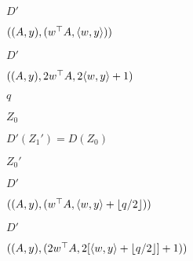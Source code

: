 \documentclass[10pt]{book}
\begin{document}
\begin{mdSnippets}
\begin{mdInlineSnippet}[0232f27be40b2b647f260050dd308eb8]%
$D'$\end{mdInlineSnippet}%
\begin{mdInlineSnippet}%
$((A,y), (w^\top A, \langle w,y \rangle))$\end{mdInlineSnippet}%
\begin{mdInlineSnippet}[0232f27be40b2b647f260050dd308eb8]%
$D'$\end{mdInlineSnippet}%
\begin{mdInlineSnippet}[c4bb7aa932c8dc3750f4cdac563381e3]%
$((A,y), 2w^\top A, 2\langle w,y \rangle + 1)$\end{mdInlineSnippet}%
\begin{mdInlineSnippet}[7694f4a66316e53c8cdd9d9954bd611d]%
$q$\end{mdInlineSnippet}%
\begin{mdInlineSnippet}[593d9b96ceba775ac243cb137dd63e4b]%
$Z_0$\end{mdInlineSnippet}%
\begin{mdInlineSnippet}[be06de8cf33017a369fda2d48475f1f0]%
$D'(Z_1') = D(Z_0)$\end{mdInlineSnippet}%
\begin{mdInlineSnippet}[db9e33ed5e5e8294b8693f8cc6334941]%
$Z_0'$\end{mdInlineSnippet}%
\begin{mdInlineSnippet}[0232f27be40b2b647f260050dd308eb8]%
$D'$\end{mdInlineSnippet}%
\begin{mdInlineSnippet}%
$((A,y), (w^\top A, \langle w,y \rangle + \lfloor q/2 \rfloor))$\end{mdInlineSnippet}%
\begin{mdInlineSnippet}[0232f27be40b2b647f260050dd308eb8]%
$D'$\end{mdInlineSnippet}%
\begin{mdInlineSnippet}[63fcafd6aa460e5f52bb4777a69302e4]%
$((A,y), (2w^\top A, 2[\langle w,y \rangle + \lfloor q/2 \rfloor] + 1))$\end{mdInlineSnippet}%
\begin{mdInlineSnippet}[03e344c5d678f065203d644e6cd8f6a0]%

\end{mdInlineSnippet}
\end{mdSnippets}
\end{document}
